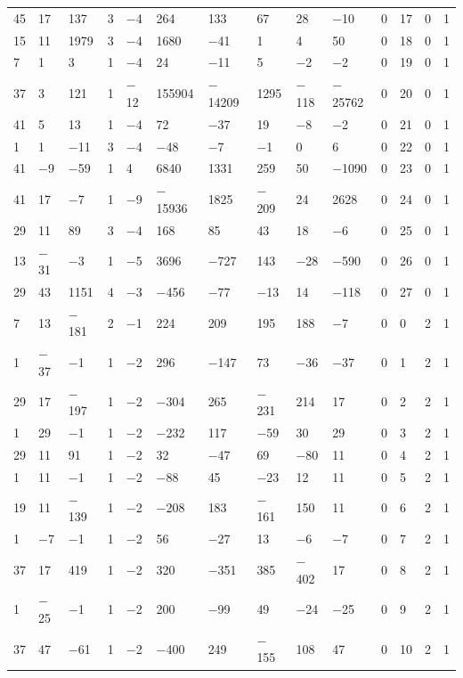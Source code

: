 \documentclass[pdftex]{sigma}
\numberwithin{equation}{section}
\theoremstyle{definition}
\numberwithin{table}{section}
\begin{document}
{\begin{paracol}{3}
\begin{supertabular}{|w{c}{.32cm}w{c}{.32cm}w{c}{.32cm}@{\hspace{.5cm}}w{c}{.2cm}w{c}{.2cm}|@{\hspace{\tabcolsep}}HHHHHHw{c}{.17cm}w{c}{.17cm}w{c}{.17cm}|}
			45 & 17 & 137 & 3 & $-$4 & 264 & 133 & 67 & 28 & $-$10 & 0 & 17 & 0 & 1 \\
			15 & 11 & 1979 & 3 & $-$4 & 1680 & $-$41 & 1 & 4 & 50 & 0 & 18 & 0 & 1 \\
			7 & 1 & 3 & 1 & $-$4 & 24 & $-$11 & 5 & $-$2 & $-$2 & 0 & 19 & 0 & 1 \\
			37 & 3 & 121 & 1 & $-$12 & 155904 & $-$14209 & 1295 & $-$118 & $-$25762 & 0 & 20 & 0 & 1 \\
			41 & 5 & 13 & 1 & $-$4 & 72 & $-$37 & 19 & $-$8 & $-$2 & 0 & 21 & 0 & 1 \\
			1 & 1 & $-$11 & 3 & $-$4 & $-$48 & $-$7 & $-$1 & 0 & 6 & 0 & 22 & 0 & 1 \\
			41 & $-$9 & $-$59 & 1 & 4 & 6840 & 1331 & 259 & 50 & $-$1090 & 0 & 23 & 0 & 1 \\
			41 & 17 & $-$7 & 1 & $-$9 & $-$15936 & 1825 & $-$209 & 24 & 2628 & 0 & 24 & 0 & 1 \\
			29 & 11 & 89 & 3 & $-$4 & 168 & 85 & 43 & 18 & $-$6 & 0 & 25 & 0 & 1 \\
			13 & $-$31 & $-$3 & 1 & $-$5 & 3696 & $-$727 & 143 & $-$28 & $-$590 & 0 & 26 & 0 & 1 \\
			29 & 43 & 1151 & 4 & $-$3 & $-$456 & $-$77 & $-$13 & 14 & $-$118 & 0 & 27 & 0 & 1 \\
			7 & 13 & $-$181 & 2 & $-$1 & 224 & 209 & 195 & 188 & $-$7 & 0 & 0 & 2 & 1 \\
			1 & $-$37 & $-$1 & 1 & $-$2 & 296 & $-$147 & 73 & $-$36 & $-$37 & 0 & 1 & 2 & 1 \\
			29 & 17 & $-$197 & 1 & $-$2 & $-$304 & 265 & $-$231 & 214 & 17 & 0 & 2 & 2 & 1 \\
			1 & 29 & $-$1 & 1 & $-$2 & $-$232 & 117 & $-$59 & 30 & 29 & 0 & 3 & 2 & 1 \\
			29 & 11 & 91 & 1 & $-$2 & 32 & $-$47 & 69 & $-$80 & 11 & 0 & 4 & 2 & 1 \\
			1 & 11 & $-$1 & 1 & $-$2 & $-$88 & 45 & $-$23 & 12 & 11 & 0 & 5 & 2 & 1 \\
			19 & 11 & $-$139 & 1 & $-$2 & $-$208 & 183 & $-$161 & 150 & 11 & 0 & 6 & 2 & 1 \\
			1 & $-$7 & $-$1 & 1 & $-$2 & 56 & $-$27 & 13 & $-$6 & $-$7 & 0 & 7 & 2 & 1 \\
			37 & 17 & 419 & 1 & $-$2 & 320 & $-$351 & 385 & $-$402 & 17 & 0 & 8 & 2 & 1 \\
			1 & $-$25 & $-$1 & 1 & $-$2 & 200 & $-$99 & 49 & $-$24 & $-$25 & 0 & 9 & 2 & 1 \\
			37 & 47 & $-$61 & 1 & $-$2 & $-$400 & 249 & $-$155 & 108 & 47 & 0 & 10 & 2 & 1 \\

\end{supertabular}
\end{paracol}}
\end{document}
